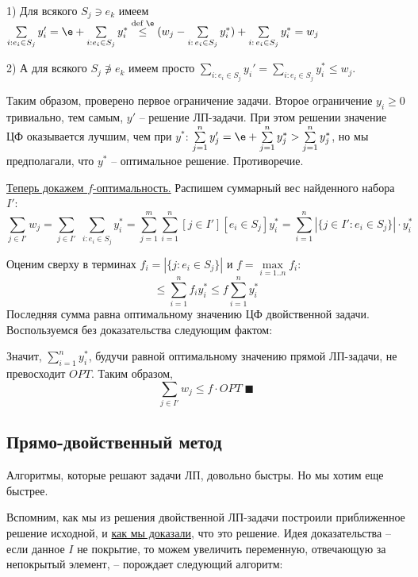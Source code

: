 1) Для всякого $S_j \ni e_k$ имеем $\sum
\limits_{i: e_i \in S_j} y_i' = \e + \sum\limits_{i: e_i \in S_j} y_i^* \overset{\text{def }\e}{\leq} (w_j - \sum\limits_{i:\, e_i \in S_j}y_i^*) + \sum\limits_{i:\, e_i \in S_j}y_i^* = w_j$

2) А для всякого $S_j \not\ni e_k$ имеем просто $\sum\limits_{i: e_i \in S_j} y_i' = \sum\limits_{i: e_i \in S_j} y_i^* \leq w_j$. 

Таким образом, проверено первое ограничение задачи. Второе ограничение $y_i \geq 0$ тривиально, тем самым, $y'$ -- решение ЛП-задачи. При этом решении значение ЦФ оказывается лучшим, чем при $y^*$: $\sum\limits^n_{j=1}y_j' = \e + \sum\limits^n_{j=1} y_j^* > \sum\limits^n_{j=1} y_j^*$, но мы предполагали, что $y^*$ -- оптимальное решение. Противоречие. 

\underline{Теперь докажем $f$-оптимальность.}
Распишем суммарный вес найденного набора $I'$:
$$\sum_{j\in I'} w_j = \sum_{j\in I'} \; \sum_{i: e_i \in S_j} y_i^* = \sum^m_{j=1}\sum^n_{i=1} [j \in I'] [e_i \in S_j] y_i^* = \sum^n_{i=1}|\{j \in I': e_i \in S_j\}|\cdot y_i^*$$

Оценим сверху в терминах $f_i = |\{j: e_i \in S_j\}|$ и $f = \max\limits_{i=1..n} f_i$:
$$ \leq \sum^n_{i=1}f_iy_i^* \leq f\sum^n_{i=1} y_i^*$$
Последняя сумма равна оптимальному значению ЦФ двойственной задачи. Воспользуемся без доказательства следующим фактом:


Значит, $\sum\limits^n_{i=1} y_i^*$, будучи равной оптимальному значению прямой ЛП-задачи, не превосходит $OPT$. Таким образом, $$\sum_{j\in I'} w_j \leq f\cdot OPT \; \blacksquare$$

\subsection{Прямо-двойственный метод}

Алгоритмы, которые решают задачи ЛП, довольно быстры. Но мы хотим еще быстрее.


Вспомним, как мы из решения двойственной ЛП-задачи построили приближенное решение исходной, и \underline{как мы доказали}, что это решение. Идея доказательства -- если данное $I$ не покрытие, то можем увеличить переменную, отвечающую за непокрытый элемент, -- порождает следующий алгоритм:

